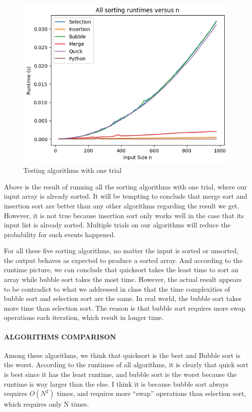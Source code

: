 \documentclass{article}
\begin{document}
\begin{figure}[H]
\centering
	\includegraphics[width = \textwidth]{../results/one_trial}
	\caption{Testing algorithms with one trial}
\end{figure}
Above is the result of running all the sorting algorithms with one trial, where our input array is already sorted. It will be tempting to conclude that merge sort and insertion sort are better than any other algorithms regarding the result we get. However, it is not true because insertion sort only works well in the case that its input list is already sorted. Multiple trials on our algorithms will reduce the probability for such events happened.


For all these five sorting algorithms, no matter the input is sorted or unsorted, the output behaves as expected to produce a sorted array. And according to the runtime picture, we can conclude that quicksort takes the least time to sort an array while bubble sort takes the most time. However, the actual result appears to be contradict to what we addressed in class that the time complexities of bubble sort and selection sort are the same. In real world, the bubble sort takes more time than selection sort. The reason is that bubble sort requires more swap operations each iteration, which result in longer time. 
\paragraph{ALGORITHMS COMPARISON}
Among these algorithms, we think that quicksort is the best and Bubble sort is the worst. According to the runtimes of all algorithms, it is clearly that quick sort is best since it has the least runtime, and bubble sort is the worst because the runtime is way larger than the else.
I think it is because bubble sort always requires $O(N^2)$ times, and requires more “swap” operations than selection sort, which requires only N times.
\end{document}
